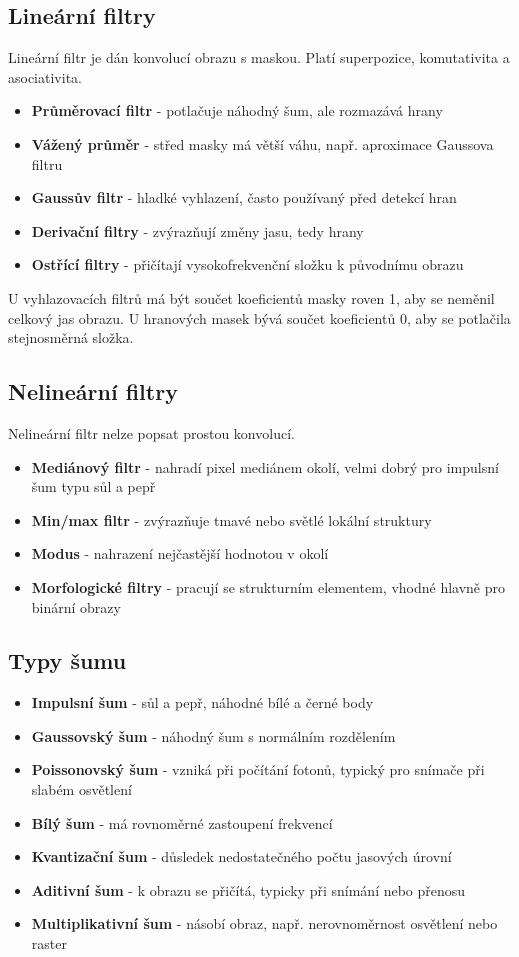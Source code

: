 \subsection*{Lineární filtry}
Lineární filtr je dán konvolucí obrazu s maskou. Platí superpozice, komutativita a asociativita.
\begin{itemize}
    \item \textbf{Průměrovací filtr} - potlačuje náhodný šum, ale rozmazává hrany
    \item \textbf{Vážený průměr} - střed masky má větší váhu, např. aproximace Gaussova filtru
    \item \textbf{Gaussův filtr} - hladké vyhlazení, často používaný před detekcí hran
    \item \textbf{Derivační filtry} - zvýrazňují změny jasu, tedy hrany
    \item \textbf{Ostřící filtry} - přičítají vysokofrekvenční složku k původnímu obrazu
\end{itemize}
U vyhlazovacích filtrů má být součet koeficientů masky roven 1, aby se neměnil celkový jas obrazu.
U hranových masek bývá součet koeficientů 0, aby se potlačila stejnosměrná složka.

\subsection*{Nelineární filtry}
Nelineární filtr nelze popsat prostou konvolucí.
\begin{itemize}
    \item \textbf{Mediánový filtr} - nahradí pixel mediánem okolí, velmi dobrý pro impulsní šum typu sůl a pepř
    \item \textbf{Min/max filtr} - zvýrazňuje tmavé nebo světlé lokální struktury
    \item \textbf{Modus} - nahrazení nejčastější hodnotou v okolí
    \item \textbf{Morfologické filtry} - pracují se strukturním elementem, vhodné hlavně pro binární obrazy
\end{itemize}

\subsection*{Typy šumu}
\begin{itemize}
    \item \textbf{Impulsní šum} - sůl a pepř, náhodné bílé a černé body
    \item \textbf{Gaussovský šum} - náhodný šum s normálním rozdělením
    \item \textbf{Poissonovský šum} - vzniká při počítání fotonů, typický pro snímače při slabém osvětlení
    \item \textbf{Bílý šum} - má rovnoměrné zastoupení frekvencí
    \item \textbf{Kvantizační šum} - důsledek nedostatečného počtu jasových úrovní
    \item \textbf{Aditivní šum} - k obrazu se přičítá, typicky při snímání nebo přenosu
    \item \textbf{Multiplikativní šum} - násobí obraz, např. nerovnoměrnost osvětlení nebo raster
\end{itemize}

